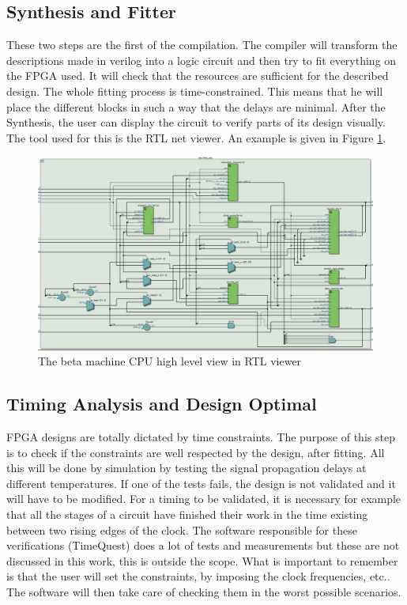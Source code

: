 \subsection{Synthesis and Fitter}

These two steps are the first of the compilation. The compiler will transform the descriptions made
 in verilog into a logic circuit and then try to fit everything on the FPGA used. It will check that 
 the resources are sufficient for the described design. The whole fitting process is 
 time-constrained. This means that he will place the different blocks in such a way that the delays 
 are minimal. After the Synthesis, the user can display the circuit to verify parts of its design
 visually. The tool used for this is the RTL net viewer. An example is given in Figure 
 \ref{fig:tools/rtl}.

 \begin{figure}[H]
    \centering
    \includegraphics[width=\linewidth]{Chapter2-FPGA_Flow/res/rtl.PNG}
    \caption{The beta machine CPU high level view in RTL viewer}
    \label{fig:tools/rtl}
\end{figure}

\subsection{Timing Analysis and Design Optimal}

FPGA designs are totally dictated by time constraints. The purpose of this step is to check if the 
constraints are well respected by the design, after fitting. All this will be done by simulation by 
testing the signal propagation delays at different temperatures. If one of the tests fails, the 
design is not validated and it will have to be modified. For a timing to be validated, it is 
necessary for example that all the stages of a circuit have finished their work in the time existing 
between two rising edges of the clock. The software responsible for these verifications (TimeQuest) 
does a lot of tests and measurements but these are not discussed in this work, this is outside the 
scope. What is important to remember is that the user will set the constraints, by imposing the clock 
frequencies, etc.. The software will then take care of checking them in the worst possible 
scenarios. 

